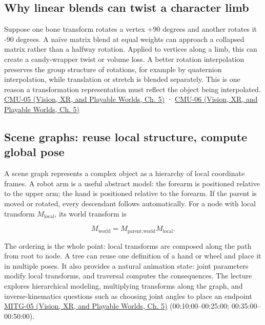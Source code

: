 \subsection{Why linear blends can twist a character limb}\label{04-visual-computing-ii-ch029-why-linear-blends-can-twist-a-character-limb}

Suppose one bone transform rotates a vertex +90 degrees and another rotates it -90 degrees. A naïve matrix blend at equal weights can approach a collapsed matrix rather than a halfway rotation. Applied to vertices along a limb, this can create a candy-wrapper twist or volume loss. A better rotation interpolation preserves the group structure of rotations, for example by quaternion interpolation, while translation or stretch is blended separately. This is one reason a transformation representation must reflect the object being interpolated. \href{../07-Vision-XR-and-Playable-Worlds/main.pdf\#nameddest=04-visual-computing-ii-ch036-cmu-05---spatial-transformations}{CMU-05 (Vision, XR, and Playable Worlds, Ch. 5)} · \href{../07-Vision-XR-and-Playable-Worlds/main.pdf\#nameddest=04-visual-computing-ii-ch036-cmu-06---3d-rotations-and-complex-representations}{CMU-06 (Vision, XR, and Playable Worlds, Ch. 5)}

\subsection{Scene graphs: reuse local structure, compute global pose}\label{04-visual-computing-ii-ch029-scene-graphs-reuse-local-structure-compute-global-pose}

A scene graph represents a complex object as a hierarchy of local coordinate frames. A robot arm is a useful abstract model: the forearm is positioned relative to the upper arm; the hand is positioned relative to the forearm. If the parent is moved or rotated, every descendant follows automatically. For a node with local transform \(M_{\mathrm{local}}\), its world transform is

\[
M_{\text{world}}=M_{\text{parent,world}}M_{\text{local}}.
\]

The ordering is the whole point: local transforms are composed along the path from root to node. A tree can reuse one definition of a hand or wheel and place it in multiple poses. It also provides a natural animation state: joint parameters modify local transforms, and traversal computes the consequences. The lecture explores hierarchical modeling, multiplying transforms along the graph, and inverse-kinematics questions such as choosing joint angles to place an endpoint \href{../07-Vision-XR-and-Playable-Worlds/main.pdf\#nameddest=04-visual-computing-ii-ch036-mitg-05---hierarchical-modeling}{MITG-05 (Vision, XR, and Playable Worlds, Ch. 5)} (00:10:00--00:25:00; 00:35:00--00:50:00).

